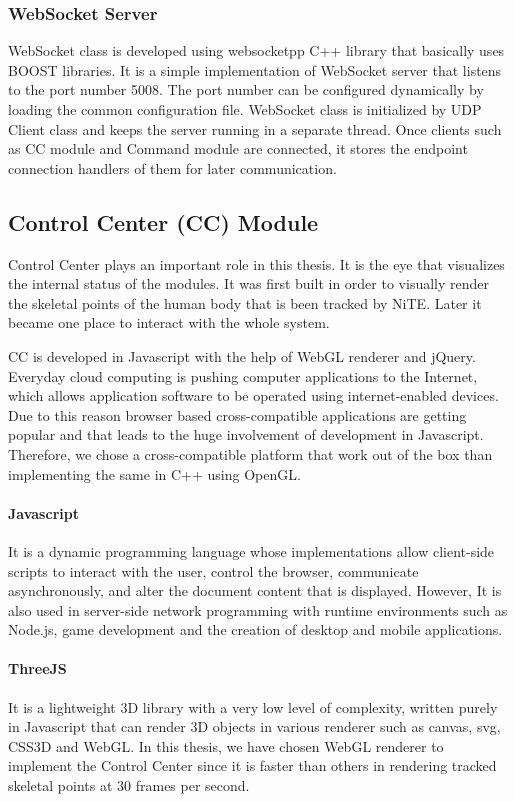 \subsubsection{WebSocket Server}
WebSocket class is developed using websocketpp C++ library that basically uses BOOST libraries. It is a simple implementation of WebSocket server that listens to the port number 5008. The port number can be configured dynamically by loading the common configuration file. WebSocket class is initialized by UDP Client class and keeps the server running in a separate thread. Once clients such as CC module and Command module are connected, it stores the endpoint connection handlers of them for later communication. 

\subsection{Control Center (CC) Module} Control Center plays an important role in this thesis. It is the eye that visualizes the internal status of the modules. It was first built in order to visually render the skeletal points of the human body that is been tracked by NiTE. Later it became one place to interact with the whole system. 

CC is developed in Javascript with the help of WebGL renderer and jQuery. Everyday cloud computing is pushing computer applications to the Internet, which allows application software to be operated using internet-enabled devices. Due to this reason browser based cross-compatible applications are getting popular and that leads to the huge involvement of development in Javascript. Therefore, we chose a cross-compatible platform that work out of the box than implementing the same in C++ using OpenGL.

\paragraph*{Javascript} It is a dynamic programming language whose implementations allow client-side scripts to interact with the user, control the browser, communicate asynchronously, and alter the document content that is displayed. However, It is also used in server-side network programming with runtime environments such as Node.js, game development and the creation of desktop and mobile applications.

\paragraph*{ThreeJS} It is a lightweight 3D library with a very low level of complexity, written purely in Javascript that can render 3D objects in various renderer such as canvas, svg, CSS3D and WebGL. In this thesis, we have chosen WebGL renderer to implement the Control Center since it is faster than others in rendering tracked skeletal points at 30 frames per second.

